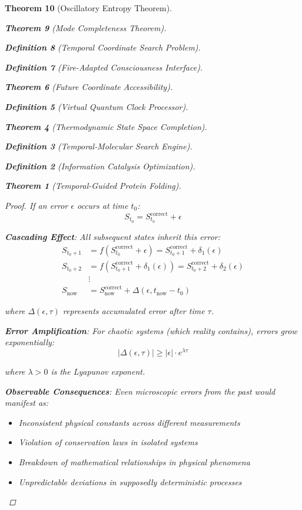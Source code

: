 \documentclass[12pt,a4paper]{article}
\newtheorem{theorem}{Theorem}[section]
\newtheorem{definition}[theorem]{Definition}
\begin{document}
\begin{theorem}[Oscillatory Entropy Theorem]
\begin{theorem}[Mode Completeness Theorem]
\begin{enumerate}
\begin{definition}[Temporal Coordinate Search Problem]
\begin{algorithm}
\begin{definition}[Fire-Adapted Consciousness Interface]
\begin{theorem}[Future Coordinate Accessibility]
\begin{definition}[Virtual Quantum Clock Processor]
\begin{itemize}
\begin{itemize}
\begin{theorem}[Thermodynamic State Space Completion]
\begin{definition}[Temporal-Molecular Search Engine]
\begin{definition}[Information Catalysis Optimization]
\begin{algorithm}
\begin{theorem}[Temporal-Guided Protein Folding]
\begin{table}[h]
\begin{proof}
If an error $\epsilon$ occurs at time $t_0$:
$$S_{t_0} = S_{t_0}^{\text{correct}} + \epsilon$$

\textbf{Cascading Effect}: All subsequent states inherit this error:
\begin{align}
S_{t_0+1} &= f(S_{t_0}^{\text{correct}} + \epsilon) = S_{t_0+1}^{\text{correct}} + \delta_1(\epsilon) \\
S_{t_0+2} &= f(S_{t_0+1}^{\text{correct}} + \delta_1(\epsilon)) = S_{t_0+2}^{\text{correct}} + \delta_2(\epsilon) \\
&\vdots \\
S_{\text{now}} &= S_{\text{now}}^{\text{correct}} + \Delta(\epsilon, t_{\text{now}} - t_0)
\end{align}

where $\Delta(\epsilon, \tau)$ represents accumulated error after time $\tau$.

\textbf{Error Amplification}: For chaotic systems (which reality contains), errors grow exponentially:
$$|\Delta(\epsilon, \tau)| \geq |\epsilon| \cdot e^{\lambda \tau}$$

where $\lambda > 0$ is the Lyapunov exponent.

\textbf{Observable Consequences}: Even microscopic errors from the past would manifest as:
\begin{itemize}
    \item Inconsistent physical constants across different measurements
    \item Violation of conservation laws in isolated systems
    \item Breakdown of mathematical relationships in physical phenomena
    \item Unpredictable deviations in supposedly deterministic processes
\end{itemize}


\end{proof}
\end{table}
\end{theorem}
\end{algorithm}
\end{definition}
\end{definition}
\end{theorem}
\end{itemize}
\end{itemize}
\end{definition}
\end{theorem}
\end{definition}
\end{algorithm}
\end{definition}
\end{enumerate}
\end{theorem}
\end{theorem}
\end{document}
